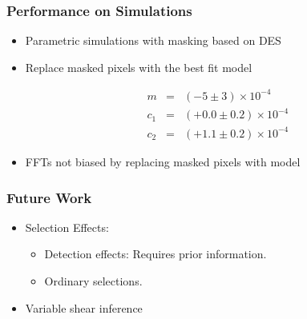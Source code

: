 \documentclass{beamer}
\begin{document}
\frame
{
    \frametitle{Performance on Simulations}

 
    \begin{itemize}
            

        \item Parametric simulations with {\color{brightred} masking based on DES}
         \item Replace masked pixels with the best fit model

             {\color{lightsteelblue} 
                 \begin{eqnarray}
                     m & = & (-5 \pm 3) \times 10^{-4} \nonumber \\
                   c_1 & = & (+0.0 \pm 0.2) \times 10^{-4} \nonumber \\
                   c_2 & = & (+1.1 \pm 0.2) \times 10^{-4} \nonumber
                 \end{eqnarray}
             }

         \item FFTs not biased by replacing masked pixels with model

    \end{itemize}

}


\frame
{
    \frametitle{Future Work}

 
    \begin{itemize}
            

         \item Selection Effects:
             \begin{itemize}
                 \item Detection effects:  Requires prior information.
                 \item Ordinary selections.  
             \end{itemize}

         \item Variable shear inference

    \end{itemize}

}
\end{document}
